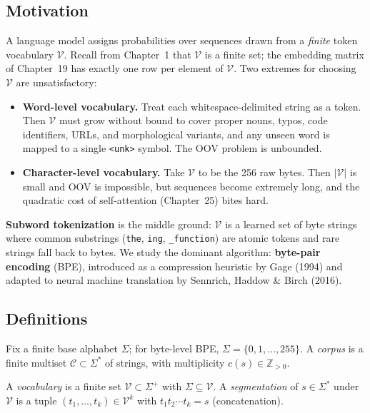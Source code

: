 \subsection*{Motivation}

A language model assigns probabilities over sequences drawn from a \emph{finite} token vocabulary $\mathcal{V}$. Recall from Chapter~1 that $\mathcal{V}$ is a finite set; the embedding matrix of Chapter~19 has exactly one row per element of $\mathcal{V}$. Two extremes for choosing $\mathcal{V}$ are unsatisfactory:

\begin{itemize}
\item \textbf{Word-level vocabulary.} Treat each whitespace-delimited string as a token. Then $\mathcal{V}$ must grow without bound to cover proper nouns, typos, code identifiers, URLs, and morphological variants, and any unseen word is mapped to a single \texttt{<unk>} symbol. The OOV problem is unbounded.
\item \textbf{Character-level vocabulary.} Take $\mathcal{V}$ to be the 256 raw bytes. Then $|\mathcal{V}|$ is small and OOV is impossible, but sequences become extremely long, and the quadratic cost of self-attention (Chapter~25) bites hard.
\end{itemize}

\textbf{Subword tokenization} is the middle ground: $\mathcal{V}$ is a learned set of byte strings where common substrings (\texttt{the}, \texttt{ing}, \texttt{\_function}) are atomic tokens and rare strings fall back to bytes. We study the dominant algorithm: \textbf{byte-pair encoding} (BPE), introduced as a compression heuristic by Gage (1994) and adapted to neural machine translation by Sennrich, Haddow \& Birch (2016).

\subsection*{Definitions}

Fix a finite base alphabet $\Sigma$; for byte-level BPE, $\Sigma = \{0, 1, \dots, 255\}$. A \emph{corpus} is a finite multiset $\mathcal{C} \subset \Sigma^*$ of strings, with multiplicity $c(s) \in \mathbb{Z}_{>0}$.

\begin{definition}
A \emph{vocabulary} is a finite set $\mathcal{V} \subset \Sigma^+$ with $\Sigma \subseteq \mathcal{V}$. A \emph{segmentation} of $s \in \Sigma^*$ under $\mathcal{V}$ is a tuple $(t_1, \dots, t_k) \in \mathcal{V}^k$ with $t_1 t_2 \cdots t_k = s$ (concatenation).
\end{definition}

